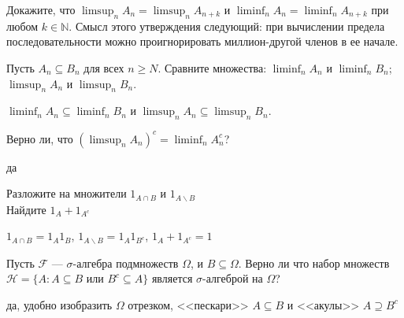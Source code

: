 \begin{solution}
\begin{problem}
\end{problem} 
\begin{solution} 

\end{solution}

\begin{problem}
Докажите, что $\limsup_{n}A_{n}=\limsup_{n}A_{n+k}$ и
$\liminf_{n}A_{n}=\liminf_{n}A_{n+k}$ при любом $k\in\mathbb{N}$.
Смысл этого утверждения следующий: при вычислении предела
последовательности можно проигнорировать миллион-другой членов в
ее начале. 
\end{problem} 
\begin{solution} 

\end{solution}

\begin{problem}
Пусть $A_{n} \subseteq B_{n}$ для всех $n\ge N$. Сравните множества: $\liminf_{n}A_{n}$ и $\liminf_{n}B_{n}$;
$\limsup_{n}A_{n}$ и $\limsup_{n}B_{n}$. 
\end{problem} 
\begin{solution} 
$\liminf_{n}A_{n} \subseteq \liminf_{n}B_{n}$ и $\limsup_{n}A_{n}
\subseteq \limsup_{n}B_{n}$.
\end{solution}

\begin{problem}
Верно ли, что $\left(\limsup_{n}A_{n}\right)^{c}=\liminf_{n}A_{n}^{c}$? 
\end{problem} 
\begin{solution} 
да
\end{solution}

\begin{problem}
Разложите на множители $1_{A\cap B}$ и $1_{A\backslash B}$ \\
Найдите $1_{A}+1_{A^{c}}$ 
\end{problem} 
\begin{solution} 
 $1_{A\cap B}=1_{A}1_{B}$, $1_{A\backslash B}=1_{A}1_{B^{c}}$, $1_{A}+1_{A^{c}}=1$
\end{solution}

\begin{problem}
Пусть $\mathcal{F}$ --- $\sigma$-алгебра подмножеств $\Omega$, и
$B\subseteq\Omega$. Верно ли что набор множеств
$\mathcal{H}=\{A:A\subseteq B$ или $B^{c}\subseteq A\}$ является
$\sigma$-алгеброй на $\Omega$? 
\end{problem} 
\begin{solution} 
да, удобно изобразить $\Omega$ отрезком, <<пескари>> $A\subseteq B$ и <<акулы>> $A \supseteq B^{c}$ 
\end{solution}


\end{solution}
